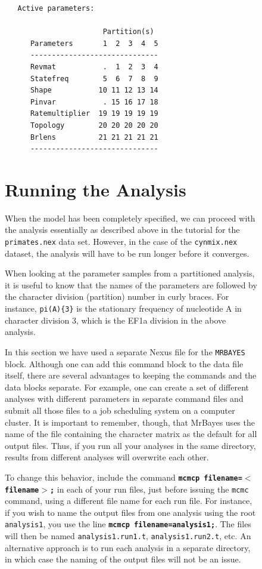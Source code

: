 \documentclass[12pt]{book}
\newcommand{\ttt}[1]{\texttt{#1}}
\newcommand{\tb}[1]{\ttt{\textbf{#1}}}
\begin{document}
\begin{figure}[h]
\begin{singlespacing}
\footnotesize
\begin{verbatim}
   Active parameters:
 
                       Partition(s)
      Parameters       1  2  3  4  5
      ------------------------------
      Revmat           .  1  2  3  4
      Statefreq        5  6  7  8  9
      Shape           10 11 12 13 14
      Pinvar           . 15 16 17 18
      Ratemultiplier  19 19 19 19 19
      Topology        20 20 20 20 20
      Brlens          21 21 21 21 21
      ------------------------------
\end{verbatim}
\normalsize
\end{singlespacing}

\section{Running the Analysis}

When the model has been completely specified, we can proceed with the analysis essentially as
described above in the tutorial for the \ttt{primates.nex} data set. However, in the case of the
\ttt{cynmix.nex} dataset, the analysis will have to be run longer before it converges.

When looking at the parameter samples from a partitioned analysis, it is useful to know that the
names of the parameters are followed by the character division (partition) number in curly braces.
For instance, \ttt{pi(A)\{3\}} is the stationary frequency of nucleotide A in character division 3,
which is the EF1a division in the above analysis.

In this section we have used a separate Nexus file for the \ttt{MRBAYES} block. Although one can
add this command block to the data file itself, there are several advantages to keeping the
commands and the data blocks separate. For example, one can create a set of different analyses with
different parameters in separate command files and submit all those files to a job scheduling
system on a computer cluster. It is important to remember, though, that MrBayes uses the name of
the file containing the character matrix as the default for all output files. Thus, if you run all
your analyses in the same directory, results from different analyses will overwrite each other.

To change this behavior, include the command \tb{mcmcp filename=$<$filename$>$;} in each of your
run files, just before issuing the \ttt{mcmc} command, using a different file name for each run
file. For instance, if you wish to name the output files from one analysis using the root
\ttt{analysis1}, you use the line \tb{mcmcp filename=analysis1;}. The files will then be named
\ttt{analysis1.run1.t}, \ttt{analysis1.run2.t}, etc. An alternative approach is to run each
analysis in a separate directory, in which case the naming of the output files will not be an
issue.


\end{figure}
\end{document}
